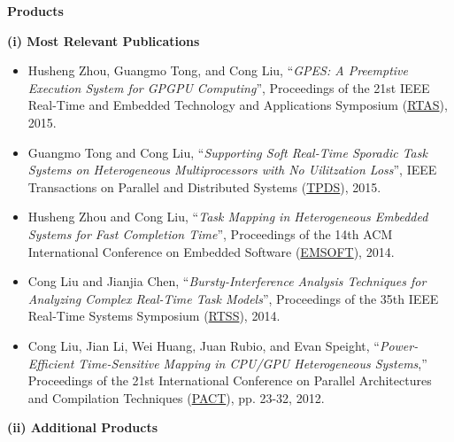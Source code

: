 \documentclass[10pt,letterpaper]{article}
\begin{document}
\noindent \textbf{Products} 

\hspace{-4mm} \textbf{(i) Most Relevant Publications}\  
	\vspace{-1mm}
	\begin{itemize}

	
\item
Husheng Zhou, Guangmo Tong, and Cong Liu, ``\textit{GPES: A Preemptive Execution System for GPGPU Computing}'', Proceedings of the 21st IEEE Real-Time and Embedded Technology and Applications Symposium (\underline{RTAS}), 2015.

\item
Guangmo Tong and Cong Liu, ``\textit{Supporting Soft Real-Time Sporadic Task Systems on Heterogeneous Multiprocessors with No Uilitzation Loss}'', IEEE Transactions on Parallel and Distributed Systems (\underline{TPDS}), 2015.

\item 
Husheng Zhou and Cong Liu, ``\textit{Task Mapping in Heterogeneous Embedded Systems for Fast Completion Time}'', Proceedings of the 14th ACM International Conference on Embedded Software (\underline{EMSOFT}), 2014.

\item 
Cong Liu and Jianjia Chen, ``\textit{Bursty-Interference Analysis Techniques for Analyzing Complex Real-Time Task Models}'', Proceedings of the 35th IEEE Real-Time Systems Symposium (\underline{RTSS}), 2014.



\item  	Cong Liu, Jian Li, Wei Huang, Juan Rubio, and Evan Speight, ``\textit{Power-Efficient Time-Sensitive Mapping in CPU/GPU Heterogeneous Systems},'' Proceedings of the 21st International Conference on Parallel Architectures and Compilation Techniques (\underline{PACT}), pp. 23-32, 2012.






\end{itemize}
\hspace{-4mm} \textbf{(ii) Additional Products}\  
\vspace{-1mm}
\end{document}
